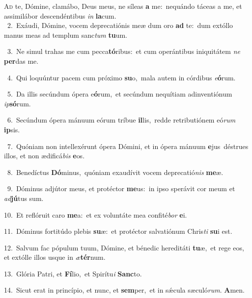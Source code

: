 \lettrine{\initial\textcolor{\initialcolor}{A}}{d} te, Dómine, clamábo, Deus meus, ne síleas \textbf{a} me:~\star nequándo táceas a me, et assimilábor descendéntibus \textit{in} \textbf{la}\-cum.\\
{\numbfont\textcolor{\numbcolor}{~2.}}~Exáudi, Dómine, vocem deprecatiónis meæ dum oro \textbf{ad} te:~\star dum extóllo manus meas ad templum sanc\textit{tum} \textbf{tu}\-um.\par
{\numbfont\textcolor{\numbcolor}{~3.}}~Ne simul trahas me cum pecca\-\textbf{tó}\-ribus:~\star et cum operántibus iniquitátem \textit{ne} \textbf{per}\-das me.\par
{\numbfont\textcolor{\numbcolor}{~4.}}~Qui loquúntur pacem cum próximo \textbf{su}\-o,~\star mala autem in córdibus \textit{e}\-\textbf{ó}rum.\par
{\numbfont\textcolor{\numbcolor}{~5.}}~Da illis secúndum ópera e\-\textbf{ó}\-rum,~\star et secúndum nequítiam adinventiónum \textit{ip}\-\textbf{só}rum.\par
{\numbfont\textcolor{\numbcolor}{~6.}}~Secúndum ópera mánuum eórum tríbue \textbf{il}\-lis,~\star redde retributiónem eó\textit{rum} \textbf{ip}\-sis.\par
{\numbfont\textcolor{\numbcolor}{~7.}}~Quóniam non intellexérunt ópera Dómini, et in ópera mánuum \textbf{e}\-jus~\star déstrues illos, et non ædificá\textit{bis} \textbf{e}\-os.\par
{\numbfont\textcolor{\numbcolor}{~8.}}~Benedíctus \textbf{Dó}\-minus,~\star quóniam exaudívit vocem deprecatió\textit{nis} \textbf{me}\-æ.\par
{\numbfont\textcolor{\numbcolor}{~9.}}~Dóminus adjútor meus, et protéctor \textbf{me}\-us:~\star in ipso sperávit cor meum et \textit{ad}\-\textbf{jú}tus sum.\par
{\numbfont\textcolor{\numbcolor}{10.}}~Et reflóruit caro \textbf{me}\-a:~\star et ex voluntáte mea confité\textit{bor} \textbf{e}\-i.\par
{\numbfont\textcolor{\numbcolor}{11.}}~Dóminus fortitúdo plebis \textbf{su}\-æ:~\star et protéctor salvatiónum Chris\textit{ti} \textbf{su}\-i est.\par
{\numbfont\textcolor{\numbcolor}{12.}}~Salvum fac pópulum tuum, Dómine, et bénedic hereditáti \textbf{tu}\-æ,~\star et rege eos, et extólle illos usque in \textit{æ}\-\textbf{tér}num.\par
{\numbfont\textcolor{\numbcolor}{13.}}~Glória Patri, et \textbf{Fí}\-lio,~\star et Spirítu\textit{i} \textbf{Sanc}\-to.\par
{\numbfont\textcolor{\numbcolor}{14.}}~Sicut erat in princípio, et nunc, et \textbf{sem}\-per,~\star et in sǽcula sæculó\-\textit{rum}\-. \textbf{A}\-men.\par
